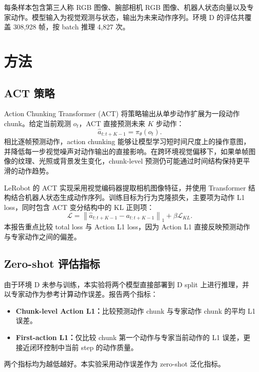 \documentclass[10pt,a4paper]{ctexart}
\begin{document}
每条样本包含第三人称 RGB 图像、腕部相机 RGB 图像、机器人状态向量以及专家动作。模型输入为视觉观测与状态，输出为未来动作序列。环境 D 的评估共覆盖 308,928 帧，按 batch 推理 4,827 次。

\section{方法}
\subsection{ACT 策略}
Action Chunking Transformer (ACT) 将策略输出从单步动作扩展为一段动作 chunk。给定当前观测 $o_t$，ACT 直接预测未来 $K$ 步动作：
\begin{equation}
  \hat{a}_{t:t+K-1} = \pi_\theta(o_t).
\end{equation}
相比逐帧预测动作，action chunking 能够让模型学习短时间尺度上的操作意图，并降低每一步视觉噪声对动作输出的直接影响。在跨环境视觉偏移下，如果单帧图像的纹理、光照或背景发生变化，chunk-level 预测仍可能通过时间结构保持更平滑的动作趋势。

LeRobot 的 ACT 实现采用视觉编码器提取相机图像特征，并使用 Transformer 结构结合机器人状态生成动作序列。训练目标为行为克隆损失，主要项为动作 L1 loss，同时包含 ACT 变分结构中的 KL 正则项：
\begin{equation}
  \mathcal{L} = \left\|\hat{a}_{t:t+K-1} - a_{t:t+K-1}\right\|_1 + \beta \mathcal{L}_{KL}.
\end{equation}
本报告重点比较 total loss 与 Action L1 loss，因为 Action L1 直接反映预测动作与专家动作之间的偏差。

\subsection{Zero-shot 评估指标}
由于环境 D 未参与训练，本实验将两个模型直接部署到 D split 上进行推理，并以专家动作为参考计算动作误差。报告两个指标：
\begin{itemize}[leftmargin=1.2em,itemsep=0.25em]
  \item \textbf{Chunk-level Action L1：}比较预测动作 chunk 与专家动作 chunk 的平均 L1 误差。
  \item \textbf{First-action L1：}仅比较 chunk 第一个动作与专家当前动作的 L1 误差，更接近闭环控制中当前 step 的动作质量。
\end{itemize}
两个指标均为越低越好。本实验采用动作误差作为 zero-shot 泛化指标。
\end{document}
